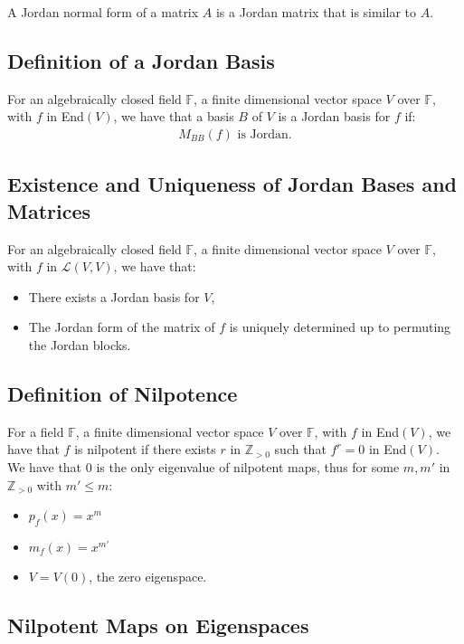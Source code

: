 \documentclass[a4paper, 12pt, twoside]{article}
\begin{document}
A Jordan normal form of a matrix $A$ is a Jordan matrix that is similar to $A$.

\subsection{Definition of a Jordan Basis}

For an algebraically closed field $\mathbb{F}$, a finite dimensional vector space $V$ over
$\mathbb{F}$, with $f$ in End$(V)$, we have that a basis $B$ of $V$ is a Jordan basis for
$f$ if: \begin{gather*}
  M_{BB}(f) \text{ is Jordan}.
\end{gather*}

\subsection{Existence and Uniqueness of Jordan Bases and Matrices}

For an algebraically closed field $\mathbb{F}$, a finite dimensional vector space $V$ over
$\mathbb{F}$, with $f$ in $\mathcal{L}(V, V)$, we have that: \begin{itemize}
  \item There exists a Jordan basis for $V$,
  \item The Jordan form of the matrix of $f$ is uniquely determined up to
  permuting the Jordan blocks.
\end{itemize}

\subsection{Definition of Nilpotence}

For a field $\mathbb{F}$, a finite dimensional vector space $V$ over $\mathbb{F}$, 
with $f$ in End$(V)$, we have that $f$ is nilpotent if there exists $r$ in $\mathbb{Z}_{>0}$ 
such that $f^r = 0$ in End$(V)$.
\\[\baselineskip]
We have that $0$ is the only eigenvalue of nilpotent maps, thus for some
$m, m'$ in $\mathbb{Z}_{>0}$ with $m' \leq m$: \begin{itemize}
  \item $p_f(x) = x^m$
  \item $m_f(x) = x^{m'}$
  \item $V = V(0)$, the zero eigenspace.
\end{itemize}

\subsection{Nilpotent Maps on Eigenspaces}
\end{document}
